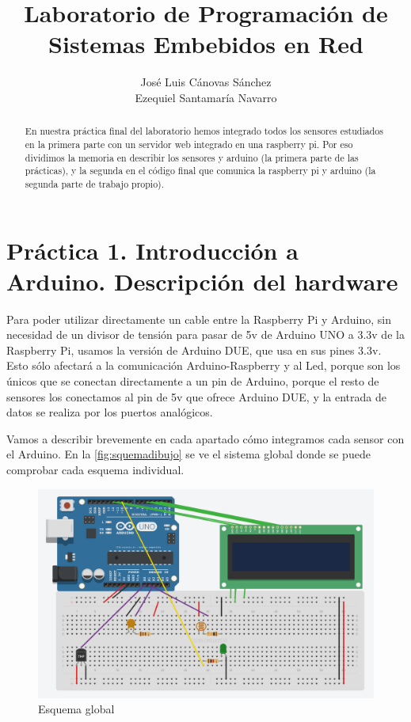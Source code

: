 \documentclass[]{article}
\title{Laboratorio de Programación de Sistemas Embebidos en Red}
\author{José Luis Cánovas Sánchez\\Ezequiel Santamaría Navarro}
\begin{document}
\maketitle


\begin{abstract}
En nuestra práctica final del laboratorio hemos integrado todos los sensores estudiados en la primera parte con un servidor web integrado en una raspberry pi. Por eso dividimos la memoria en describir los sensores y arduino (la primera parte de las prácticas), y la segunda en el código final que comunica la raspberry pi y arduino (la segunda parte de trabajo propio).
\end{abstract}

\tableofcontents

\clearpage

\section{Práctica 1. Introducción a Arduino. Descripción del hardware}
Para poder utilizar directamente un cable entre la Raspberry Pi y Arduino, sin necesidad de un divisor de tensión para pasar de 5v de Arduino UNO a 3.3v de la Raspberry Pi, usamos la versión de Arduino DUE, que usa en sus pines 3.3v. Esto sólo afectará a la comunicación Arduino-Raspberry y al Led, porque son los únicos que se conectan directamente a un pin de Arduino, porque el resto de sensores los conectamos al pin de 5v que ofrece Arduino DUE, y la entrada de datos se realiza por los puertos analógicos.

Vamos a describir brevemente en cada apartado cómo integramos cada sensor con el Arduino. En la  \autoref{fig:squemadibujo} se ve el sistema global donde se puede comprobar cada esquema individual.

\begin{figure}[H]
	\centering
	\includegraphics[width=1\linewidth]{images/squemaDibujo.PNG}
	\caption{Esquema global}
	\label{fig:squemadibujo}
\end{figure}
\end{document}
